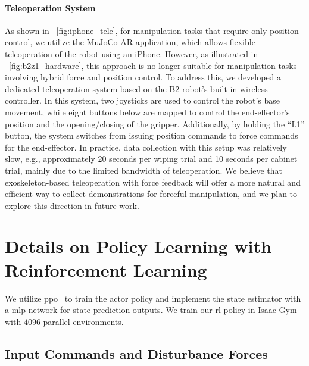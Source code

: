\documentclass{article}
\begin{document}
\paragraph{Teleoperation System}
As shown in ~\cref{fig:iphone_tele}, for manipulation tasks that require only position control, we utilize the MuJoCo AR application, which allows flexible teleoperation of the robot using an iPhone. However, as illustrated in ~\cref{fig:b2z1_hardware}, this approach is no longer suitable for manipulation tasks involving hybrid force and position control. To address this, we developed a dedicated teleoperation system based on the B2 robot’s built-in wireless controller. In this system, two joysticks are used to control the robot's base movement, while eight buttons below are mapped to control the end-effector's position and the opening/closing of the gripper. Additionally, by holding the “L1” button, the system switches from issuing position commands to force commands for the end-effector.
In practice, data collection with this setup was relatively slow, e.g., approximately 20 seconds per wiping trial and 10 seconds per cabinet trial, mainly due to the limited bandwidth of teleoperation. We believe that exoskeleton-based teleoperation with force feedback will offer a more natural and efficient way to collect demonstrations for forceful manipulation, and we plan to explore this direction in future work.

\section{Details on Policy Learning with Reinforcement Learning} \label{sec:appendix:rl_training_details}

We utilize \ac{ppo}~\cite{schulman2017proximal} to train the actor policy and implement the state estimator with a \ac{mlp} network for state prediction outputs. We train our \ac{rl} policy in Isaac Gym~\cite{makoviychuk2021isaac} with $4096$ parallel environments.  

\subsection{Input Commands and Disturbance Forces} \label{sec:appendix:cmd_details}
\end{document}

